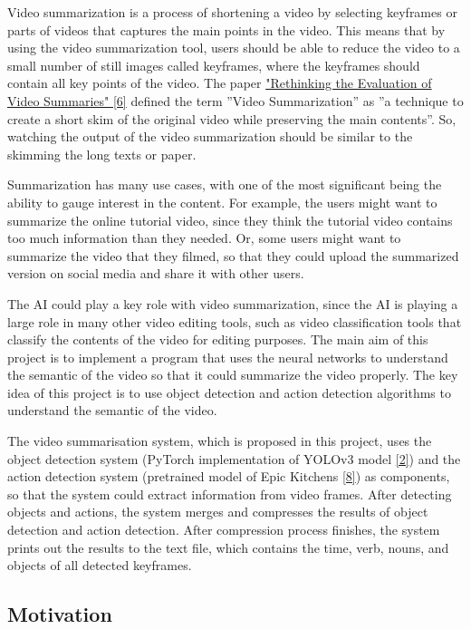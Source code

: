 \documentclass{article}
\begin{document}
Video summarization is a process of shortening a video by selecting keyframes or parts of videos that captures the main points in the video. This means that by using the video summarization tool, users should be able to reduce the video to a small number of still images called keyframes, where the keyframes should contain all key points of the video. The paper \hyperlink{ref6}{"Rethinking the Evaluation of Video Summaries" [6]} defined the term ”Video Summarization” as ”a technique to create a short skim of the original video while preserving the main contents”. So, watching the output of the video summarization should be similar to the skimming the long texts or paper.

Summarization has many use cases, with one of the most significant being the ability to gauge interest in the content. For example, the users might want to summarize the online tutorial video, since they think the tutorial video contains too much information than they needed. Or, some users might want to summarize the video that they filmed, so that they could upload the summarized version on social media and share it with other users.

The AI could play a key role with video summarization, since the AI is playing a large role in many other video editing tools, such as video classification tools that classify the contents of the video for editing purposes. The main aim of this project is to implement a program that uses the neural networks to understand the semantic of the video so that it could summarize the video properly. The key idea of this project is to use object detection and action detection algorithms to understand the semantic of the video.

The video summarisation system, which is proposed in this project, uses the object detection system (PyTorch implementation of YOLOv3 model \hyperlink{ref2}{[2]}) and the action detection system (pretrained model of Epic Kitchens \hyperlink{ref8}{[8]}) as components, so that the system could extract information from video frames. After detecting objects and actions, the system merges and compresses the results of object detection and action detection. After compression process finishes, the system prints out the results to the text file, which contains the time, verb, nouns, and objects of all detected keyframes.


\subsection{Motivation}
\end{document}
